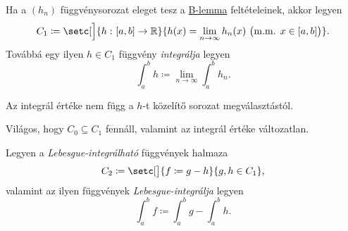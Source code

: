 \documentclass[
]{elteikthesis}[2024/04/26]
\begin{document}
	\newpage
	
	\begin{definition}{}{}
		Ha a \( (h_n) \) függvénysorozat eleget tesz a \hyperref[lem:riesz-b]{B-lemma} feltételeinek, akkor legyen
		\[
			C_1 \coloneq
			\setc[\Big]{ \func{h}{[a, b]}{\R} }
	    			   { h(x) = \lim_{n \to \infty} h_n(x) \ 
	    			   	 \bigl(\text{m.m. } x \in [a,b] \bigr) }.
		\]
		Továbbá egy ilyen \( h \in C_1 \) függvény \emph{integrálja} legyen
		\[
			\int_a^b h \coloneq \lim_{n \to \infty} \int_a^b h_n.
		\]
	\end{definition}
	\begin{notes}
		\item
		Az integrál értéke nem függ a \( h \)-t közelítő sorozat megválasztástól.
		
		\item 
		Világos, hogy \( C_0 \subseteq C_1 \) fennáll, 
		valamint az integrál értéke változatlan.
	\end{notes}
	
%	
	
	\begin{definition}{}{}
		Legyen a \emph{Lebesgue-integrálható} függvények halmaza
		\[
			C_2 \coloneq
			\setc[\big]{ f \coloneq g - h }{ g, h \in C_1 },
		\]
		valamint az ilyen függvények \emph{Lebesgue-integrálja} legyen
		\[
			\int_a^b f \coloneq \int_a^b g - \int_a^b h.
		\]
	\end{definition}
	
\end{document}
